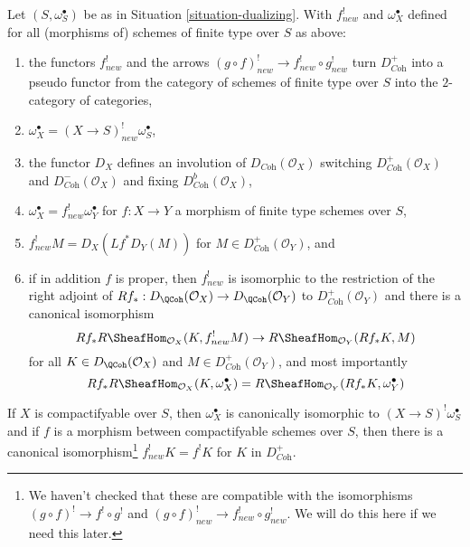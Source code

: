 \begin{lemma}
\label{lemma-duality-bootstrap}
Let $(S, \omega_S^\bullet)$ be as in Situation \ref{situation-dualizing}.
With $f^!_{new}$ and $\omega_X^\bullet$ defined for all (morphisms of)
schemes of finite type over $S$ as above:
\begin{enumerate}
\item the functors $f^!_{new}$ and the arrows
$(g \circ f)^!_{new} \to f^!_{new} \circ g^!_{new}$
turn $D_{\textit{Coh}}^+$ into a pseudo functor from the category of
schemes of finite type over $S$ into the $2$-category of categories,
\item $\omega_X^\bullet = (X \to S)^!_{new} \omega_S^\bullet$,
\item the functor $D_X$
defines an involution of $D_{\textit{Coh}}(\mathcal{O}_X)$
switching $D_{\textit{Coh}}^+(\mathcal{O}_X)$ and
$D_{\textit{Coh}}^-(\mathcal{O}_X)$ and fixing
$D_{\textit{Coh}}^b(\mathcal{O}_X)$,
\item $\omega_X^\bullet = f^!_{new}\omega_Y^\bullet$ for
$f : X \to Y$ a morphism of finite type schemes over $S$,
\item $f^!_{new}M = D_X(Lf^*D_Y(M))$ for
$M \in D_{\textit{Coh}}^+(\mathcal{O}_Y)$, and
\item if in addition $f$ is proper, then $f^!_{new}$ is isomorphic
to the restriction of the right adjoint of
$Rf_* : D_\QCoh(\mathcal{O}_X) \to D_\QCoh(\mathcal{O}_Y)$ to
$D_{\textit{Coh}}^+(\mathcal{O}_Y)$ and there is a canonical isomorphism
$$
Rf_*R\SheafHom_{\mathcal{O}_X}(K, f^!_{new}M)
\to
R\SheafHom_{\mathcal{O}_Y}(Rf_*K, M)
$$
for all $K \in D_\QCoh(\mathcal{O}_X)$ and
$M \in D_{\textit{Coh}}^+(\mathcal{O}_Y)$, and most importantly
$$
Rf_*R\SheafHom_{\mathcal{O}_X}(K, \omega_X^\bullet) =
R\SheafHom_{\mathcal{O}_Y}(Rf_*K, \omega_Y^\bullet)
$$
\end{enumerate}
If $X$ is compactifyable over $S$, then
$\omega_X^\bullet$ is canonically isomorphic to
$(X \to S)^!\omega_S^\bullet$ and
if $f$ is a morphism between compactifyable schemes
over $S$, then there is a canonical isomorphism\footnote{We haven't
checked that these are compatible with the isomorphisms
$(g \circ f)^! \to f^! \circ g^!$ and
$(g \circ f)^!_{new} \to f^!_{new} \circ g^!_{new}$. We will do this
here if we need this later.}
$f_{new}^!K = f^!K$ for $K$ in $D_{\textit{Coh}}^+$.
\end{lemma}

